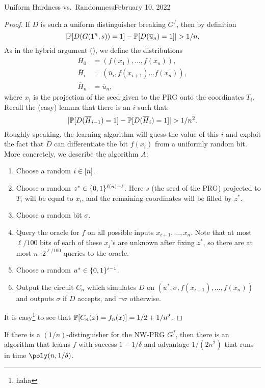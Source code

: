 \begin{lecture}{4}{Uniform Hardness vs.\ Randomness}{February 10, 2022}
\begin{proof}
  If $D$ is such a uniform distinguisher breaking $G^f$, then by definition
	\[
		\lvert\mathbb{P}[D(G(1^n, s)) = 1] - \mathbb{P}[D(\overline{u}_n) = 1]\rvert >
		1 / n.
	\]
  As in the hybrid argument (), we define the
  distributions
  \begin{align*}
    \overline{H}_0 &= (f(x_1), \ldots  ,f(x_n)),\\
    \overline{H}_i &= (\overline{u}_i, f(x_{i + 1}) \ldots f(x_n)),\\
    \overline{H}_n &= \overline{u}_n,
  \end{align*}
  where $x_i$ is the projection of the seed given to the PRG onto the
  coordinates $T_i$. Recall the (easy) lemma that there is an $i$ such that:
	\[
		\lvert\mathbb{P}[D(\overline{H}_{i - 1}) = 1] - \mathbb{P}[D(\overline{H}_i) = 1]\rvert > 1 / n^2.
	\]
  Roughly speaking, the learning algorithm will guess the value of this $i$ and
  exploit the fact that $D$ can differentiate the bit $f(x_i)$ from a uniformly
  random bit. More concretely, we describe the algorithm $A$:
	\begin{enumerate}
		\item Choose a random $i \in [n]$.
		\item Choose a random $z^* \in \{0, 1\}^{\ell(n) - \ell}$. Here $s$
			(the seed of the PRG) projected to $T_i$ will be equal to $x_i$,
			and the remaining coordinates will be filled by $z^*$.
		\item Choose a random bit $\sigma$.
		\item Query the oracle for $f$ on all possible inputs
			$x_{i + 1}, \ldots , x_n$. Note that at most $\ell / 100$ bits of
			each of these $x_j$'s are unknown after fixing $z^*$, so there
			are at most $n \cdot 2^{\ell / 100}$ queries to the oracle.
		\item Choose a random $u^* \in \{0, 1\}^{i - 1}$.
		\item Output the circuit $C_n$ which simulates $D$ on
			$(u^*, \sigma, f(x_{i + 1}), \ldots , f(x_n))$ and outputs
			$\sigma$ if $D$ accepts, and $\lnot \sigma$ otherwise.
	\end{enumerate}
	It is easy\footnote{haha} to see that
	$\mathbb{P}[C_n(x) = f_n(x)] = 1/2 + 1/n^2$.
\end{proof}

\begin{corollary}
  If there is a $(1/n)$-distinguisher for the NW-PRG $G^f$, then there is an
  algorithm that learns $f$ with success $1 - 1/\delta$ and advantage
  $1/(2n^2)$ that runs in time $\poly(n, 1/\delta)$.
\end{corollary}


\end{lecture}

